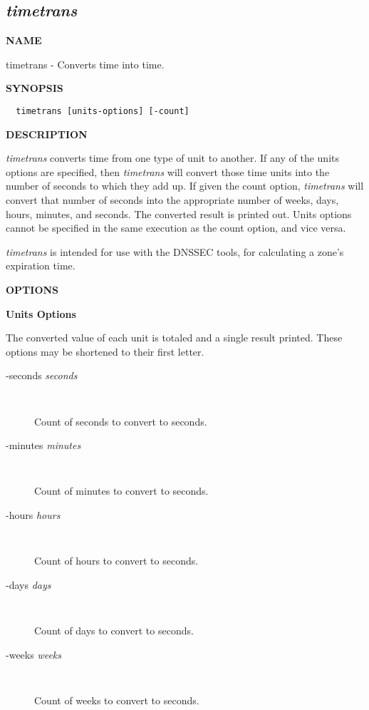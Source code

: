 \clearpage

\subsection{{\it timetrans}}


{\bf NAME}

timetrans - Converts time into time.

{\bf SYNOPSIS}

\begin{verbatim}  timetrans [units-options] [-count]\end{verbatim}

{\bf DESCRIPTION}

{\it timetrans} converts time from one type of unit to another.  If any of the
units options are specified, then {\it timetrans} will convert those time units
into the number of seconds to which they add up.  If given the count option,
{\it timetrans} will convert that number of seconds into the appropriate number
of weeks, days, hours, minutes, and seconds.  The converted result is printed
out.  Units options cannot be specified in the same execution as the count
option, and vice versa.

{\it timetrans} is intended for use with the DNSSEC tools, for calculating
a zone's expiration time.

{\bf OPTIONS}

{\bf Units Options}

The converted value of each unit is totaled and a single result printed.
These options may be shortened to their first letter.

\begin{description}

\item [-seconds {\it seconds}]\verb" "

Count of seconds to convert to seconds.

\item [-minutes {\it minutes}]\verb" "

Count of minutes to convert to seconds.

\item [-hours {\it hours}]\verb" "

Count of hours to convert to seconds.

\item [-days {\it days}]\verb" "

Count of days to convert to seconds.

\item [-weeks {\it weeks}]\verb" "

Count of weeks to convert to seconds.

\end{description}

